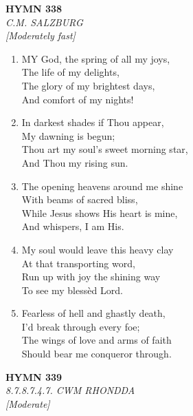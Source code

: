 \newpage
\begin{center}
    {\Large \textbf{HYMN 338}}
    \\
    \textit{C.M. SALZBURG}
    \\
    \textit{\small [Moderately fast]}
\end{center}
\vspace{1em}

\begin{enumerate}
    \item MY God, the spring of all my joys, \\
        The life of my delights, \\
        The glory of my brightest days, \\
        And comfort of my nights!

    \item In darkest shades if Thou appear, \\
        My dawning is begun; \\
        Thou art my soul's sweet morning star, \\
        And Thou my rising sun.

    \item The opening heavens around me shine \\
        With beams of sacred bliss, \\
        While Jesus shows His heart is mine, \\
        And whispers, I am His.

    \item My soul would leave this heavy clay \\
        At that transporting word, \\
        Run up with joy the shining way \\
        To see my bless\`ed Lord.

    \item Fearless of hell and ghastly death, \\
        I'd break through every foe; \\
        The wings of love and arms of faith \\
        Should bear me conqueror through.

\end{enumerate}

\newpage
\begin{center}
    {\Large \textbf{HYMN 339}}
    \\
    \textit{8.7.8.7.4.7. CWM RHONDDA}
    \\
    \textit{\small [Moderate]}
\end{center}
\vspace{1em}

